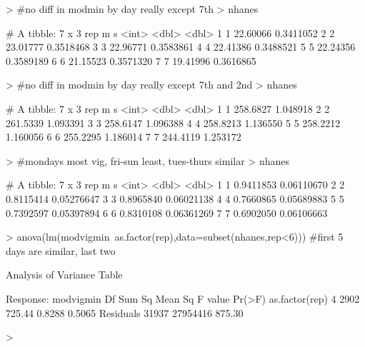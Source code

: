 \documentclass[11pt]{article}
\begin{document}
\begin{Schunk}
\begin{Sinput}
> #no diff in modmin by day really except 7th
> nhanes %>% group_by(rep) %>% summarise(m=mean(modvigmin),s=sd(modmin)/sqrt(length(modmin)))
\end{Sinput}
\begin{Soutput}
# A tibble: 7 x 3
    rep        m         s
  <int>    <dbl>     <dbl>
1     1 22.60066 0.3411052
2     2 23.01777 0.3518468
3     3 22.96771 0.3583861
4     4 22.41386 0.3488521
5     5 22.24356 0.3589189
6     6 21.15523 0.3571320
7     7 19.41996 0.3616865
\end{Soutput}
\begin{Sinput}
> #no diff in modmin by day really except 7th and 2nd
> nhanes %>% group_by(rep) %>% summarise(m=mean(lightmin),s=sd(lightmin)/sqrt(length(lightmin)))
\end{Sinput}
\begin{Soutput}
# A tibble: 7 x 3
    rep        m        s
  <int>    <dbl>    <dbl>
1     1 258.6827 1.048918
2     2 261.5339 1.093391
3     3 258.6147 1.096388
4     4 258.8213 1.136550
5     5 258.2212 1.160056
6     6 255.2295 1.186014
7     7 244.4119 1.253172
\end{Soutput}
\begin{Sinput}
> #mondays most vig, fri-sun least, tues-thurs similar
> nhanes %>% group_by(rep) %>% summarise(m=mean(vigmin),s=sd(vigmin)/sqrt(length(lightmin)))
\end{Sinput}
\begin{Soutput}
# A tibble: 7 x 3
    rep         m          s
  <int>     <dbl>      <dbl>
1     1 0.9411853 0.06110670
2     2 0.8115414 0.05276647
3     3 0.8965840 0.06021138
4     4 0.7660865 0.05689883
5     5 0.7392597 0.05397894
6     6 0.8310108 0.06361269
7     7 0.6902050 0.06106663
\end{Soutput}
\begin{Sinput}
> anova(lm(modvigmin~as.factor(rep),data=subset(nhanes,rep<6))) #first 5 days are similar, last two
\end{Sinput}
\begin{Soutput}
Analysis of Variance Table

Response: modvigmin
                  Df   Sum Sq Mean Sq F value Pr(>F)
as.factor(rep)     4     2902  725.44  0.8288 0.5065
Residuals      31937 27954416  875.30               
\end{Soutput}
\begin{Sinput}
> 
\end{Sinput}
\end{Schunk}
\end{document}
